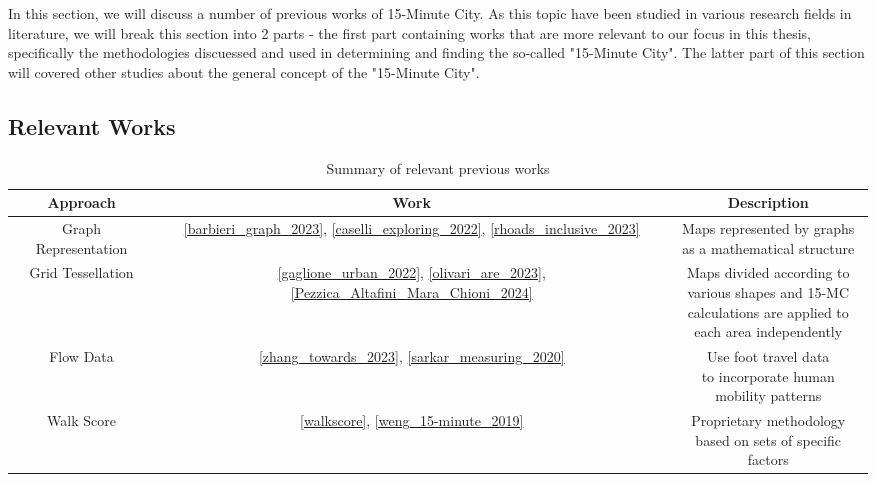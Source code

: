 In this section, we will discuss a number of previous works of 15-Minute City. As this topic have been studied in various research fields in literature, we will break this section into 2 parts - the first part containing works that are more relevant to our focus in this thesis, specifically the methodologies discuessed and used in determining and finding the so-called "15-Minute City". The latter part of this section will covered other studies about the general concept of the "15-Minute City".

\subsection{Relevant Works}
\begin{table}[!h]
    \begin{center}
        \caption{Summary of relevant previous works}
        \label{previous_works}
        \begin{tabular}{ |c|c|c| }
            \hline
            \textbf{Approach} & \textbf{Work} & \textbf{Description} \\
            \hline
            \hline
            Graph Representation & \ref{barbieri_graph_2023}, \ref{caselli_exploring_2022}, \ref{rhoads_inclusive_2023} & \makecell{Maps represented by graphs\\as a mathematical structure}\\
            \hline
            Grid Tessellation & \ref{gaglione_urban_2022}, \ref{olivari_are_2023}, \ref{Pezzica_Altafini_Mara_Chioni_2024} & \makecell{Maps divided according to \\ various shapes and 15-MC\\calculations are applied to\\each area independently} \\
            \hline
            Flow Data & \ref{zhang_towards_2023}, \ref{sarkar_measuring_2020} & \makecell{Use foot travel data\\to incorporate human\\mobility patterns} \\
            \hline
            Walk Score & \ref{walkscore}, \ref{weng_15-minute_2019} & \makecell{Proprietary methodology\\based on sets of specific factors} \\
            \hline
        \end{tabular}
    \end{center}
\end{table}

